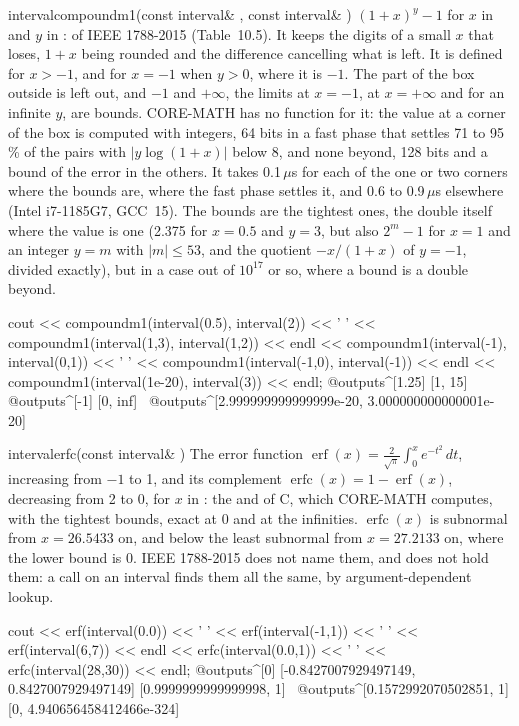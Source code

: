 \begin{deffun}{interval}{compoundm1}{(const interval\& , const interval\& )}
  $(1+x)^y-1$ for $x$ in  and $y$ in :  of
  IEEE 1788-2015 (Table~10.5). It keeps the digits of a small $x$ that
   loses, $1+x$ being rounded and the difference
  cancelling what is left. It is defined for $x>-1$, and for $x=-1$ when
  $y>0$, where it is $-1$. The part of the box outside is left out, and $-1$
  and $+\infty$, the limits at $x=-1$, at $x=+\infty$ and for an infinite
  $y$, are bounds. CORE-MATH has no function for it: the value at a corner
  of the box is computed with integers, 64 bits in a fast phase that settles
  71 to 95\,\% of the pairs with $|y\log(1+x)|$ below 8, and none beyond, 128
  bits and a bound of the error in the others. It takes 0.1\,$\mu$s for each
  of the one or two corners where the bounds are, where the fast phase settles
  it, and 0.6 to 0.9\,$\mu$s elsewhere (Intel i7-1185G7, GCC~15). The
  bounds are the tightest ones, the double itself where the value is one
  (2.375 for $x=0.5$ and $y=3$, but also $2^m-1$ for $x=1$ and an integer
  $y=m$ with $|m|\le53$, and the
  quotient $-x/(1+x)$ of $y=-1$, divided exactly), but in a case out of
  $10^{17}$ or so, where a bound is a double beyond.\newinvfive
\begin{example}
cout << compoundm1(interval(0.5), interval(2)) << ' '
     << compoundm1(interval(1,3), interval(1,2)) << endl
     << compoundm1(interval(-1), interval(0,1)) << ' '
     << compoundm1(interval(-1,0), interval(-1)) << endl
     << compoundm1(interval(1e-20), interval(3)) << endl;
@outputs^[1.25] [1, 15]~
@outputs^[-1] [0, inf]~
@outputs^[2.999999999999999e-20, 3.000000000000001e-20]~
\end{example}
\end{deffun}

\begin{deffun}{interval}{erfc}{(const interval\& )}
  The error function $\operatorname{erf}(x)=\frac{2}{\sqrt{\pi}}\int_0^x
  e^{-t^2}\,dt$, increasing from $-1$ to 1, and its complement
  $\operatorname{erfc}(x)=1-\operatorname{erf}(x)$, decreasing from 2 to 0,
  for $x$ in : the  and  of C, which CORE-MATH
  computes, with the tightest bounds, exact at 0 and at the infinities.
  $\operatorname{erfc}(x)$ is subnormal from $x=26.5433$ on, and below the
  least subnormal from $x=27.2133$ on, where the lower bound is 0. IEEE
  1788-2015 does not name them, and  does not hold
  them: a call  on an interval finds them all the same,
  by argument-dependent lookup.\newinvfive
\begin{example}
cout << erf(interval(0.0)) << ' ' << erf(interval(-1,1)) << ' '
     << erf(interval(6,7)) << endl
     << erfc(interval(0.0,1)) << ' ' << erfc(interval(28,30)) << endl;
@outputs^[0] [-0.8427007929497149, 0.8427007929497149] [0.9999999999999998, 1]~
@outputs^[0.1572992070502851, 1] [0, 4.940656458412466e-324]~
\end{example}
\end{deffun}

